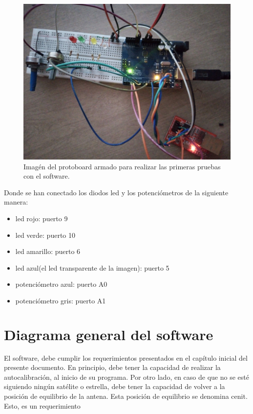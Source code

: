 \begin{figure}[H]
	\centering
	\includegraphics[scale=0.08]{protoboard_1}
	\caption{Imagén del protoboard armado para realizar las primeras pruebas con el software.}
	\label{fig:proto_1}
\end{figure}



\vspace{20mm}
Donde se han conectado los diodos led y los potenciómetros de la siguiente manera: 
\begin{itemize}
	\item led rojo: puerto 9 
	\item led verde: puerto 10 
	\item led amarillo: puerto 6 
	\item led azul(el led transparente de la imagen): puerto 5 
	\item potenciómetro azul: puerto A0 
	\item potenciómetro gris: puerto A1 
	
\end{itemize}


\section{Diagrama general del software}

El software, debe cumplir los requerimientos presentados en el capítulo inicial del presente documento. En principio, debe tener la capacidad de realizar la autocalibración, al inicio de su programa. Por otro lado, en caso  de que no se esté siguiendo ningún satélite o estrella, debe tener la capacidad de volver a la posición de equilibrio de la antena. Esta posición de equilibrio se denomina cenit. Esto, es un requerimiento 

